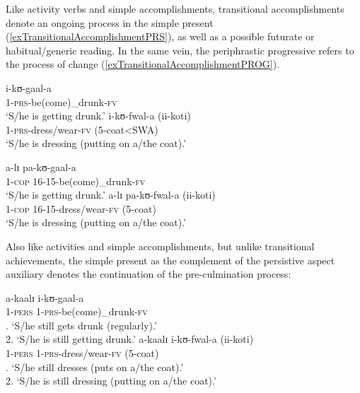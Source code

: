Like activity verbs and simple accomplishments, transitional accomplishments denote an ongoing process in the simple present (\ref{exTransitionalAccomplishmentPRS}), as well as a possible futurate or habitual/generic reading. In the same vein, the periphrastic progressive refers to the process of change (\ref{exTransitionalAccomplishmentPROG}).
\begin{exe}
\ex \label{exTransitionalAccomplishmentPRS}
\begin{xlist}
\ex\gll i-kʊ-gaal-a\\
1-\textsc{prs}-be(come)\_drunk-\textsc{fv}\\
\glt `S/he is getting drunk.'
\ex\gll i-kʊ-fwal-a \textup{(}ii-koti\textup{)}\\
1-\textsc{prs}-dress/wear-\textsc{fv} (5-coat<SWA)\\
\glt `S/he is dressing (putting on a/the coat).'
\end{xlist}
\ex \label{exTransitionalAccomplishmentPROG}
\begin{xlist}
\ex\gll a-lɪ pa-kʊ-gaal-a\\
1-\textsc{cop} 16-15-be(come)\_drunk-\textsc{fv}\\
\glt `S/he is getting drunk.'
\ex\gll a-lɪ pa-kʊ-fwal-a \textup{(}ii-koti\textup{)}\\
1-\textsc{cop} 16-15-dress/wear-\textsc{fv} (5-coat)\\
\glt `S/he is dressing (putting on a/the coat).'
\end{xlist}
\end{exe}

\largerpage
Also like activities and simple accomplishments, but unlike transitional achievements, the simple present as the complement of the persistive aspect auxiliary denotes the continuation of the pre-culmination process:
\begin{exe}
\ex\label{exTransitionalAccomplishmentPERSPRS}
\begin{xlist}
\ex\gll a-kaalɪ i-kʊ-gaal-a\\
1-\textsc{pers} 1-\textsc{prs}-be(come)\_drunk-\textsc{fv}\\
. \lq S/he still gets drunk (regularly).'\\
2. \lq S/he is still getting drunk.'
\ex\gll a-kaalɪ i-kʊ-fwal-a \textup{(}ii-koti\textup{)}\\
1-\textsc{pers} 1-\textsc{prs}-dress/wear-\textsc{fv} (5-coat)\\
. \lq S/he still dresses (puts on a/the coat).'\\
2. \lq S/he is still dressing (putting on a/the coat).'
\end{xlist}
\end{exe}

